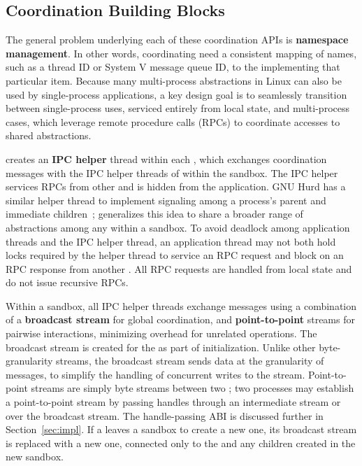 \subsection{Coordination Building Blocks}
\label{sec:graphene:namespaces:blocks}

The general problem underlying each of these coordination APIs is 
{\bf namespace management}.  In other words, coordinating \picoprocs{} need 
a consistent mapping of names, such as a thread ID or System V message queue ID, 
to the \picoproc{} implementing that particular item.  
Because many multi-process abstractions in Linux can also be used by single-process applications,
a key design goal is to seamlessly transition between single-process uses, serviced 
entirely from local \libos{} state, and multi-process cases, which
leverage remote procedure calls (RPCs) to coordinate accesses to shared abstractions.


\sysname{} creates an  {\bf IPC helper} thread within each \picoproc{},
which exchanges coordination messages with the IPC helper threads of \picoprocs{} 
within the sandbox. %
The IPC helper
services RPCs from other \picoprocs{} and is
hidden from the application. 
GNU Hurd has a similar helper thread to implement signaling among a process's parent and
immediate children~\citep{hurd};
\sysname{} generalizes this idea to share a broader range of abstractions among any \picoprocs{}
within a sandbox.
To avoid deadlock among application threads and the IPC helper thread, 
an application thread may not both hold locks required by the helper thread to service an RPC request
and block
on an RPC response from another \picoproc{}.
All RPC requests are handled from local state and do not issue recursive RPCs.%

Within a sandbox, all IPC helper threads exchange messages using a
combination of a {\bf broadcast stream} for global coordination,
and {\bf point-to-point} streams for pairwise interactions, 
minimizing overhead for unrelated operations.
The broadcast stream is created for the \picoproc{} as part of initialization.
Unlike other byte-granularity streams, the broadcast stream sends data at the granularity of messages,
to simplify the handling of concurrent writes to the stream.
Point-to-point streams are simply byte streams between two \picoprocs{};
two processes may establish a point-to-point stream by passing handles through 
an intermediate stream or over the broadcast stream.
The handle-passing ABI is discussed further in Section~\ref{sec:impl}.
If a \picoproc{} leaves a sandbox to create a new one,
its broadcast stream is replaced
with a new one, connected only to the \picoproc{} and any children created in the
new sandbox.

